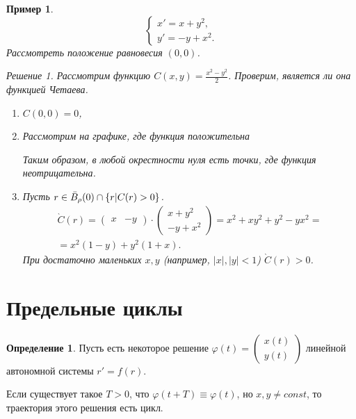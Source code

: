 \documentclass[a5paper, 10pt]{article}
\theoremstyle{definition}
\newtheorem{Def}{Определение}
\theoremstyle{plain}
\newtheorem{Ex}{Пример}
\theoremstyle{remark}
\newtheorem*{Solution}{Решение}
\begin{document}
	\begin{Ex}
		\[
		\begin{cases}
			x' = x+ y^2,\\
			y'=-y+x^2.
		\end{cases}
		\]
		Рассмотреть положение равновесия $(0,0)$.
		\begin{Solution}
			Рассмотрим функцию $C(x,y) = \frac{x^2-y^2}{2}$. Проверим, является ли она функцией Четаева.
			\begin{enumerate}
				\item $C(0,0) = 0$,
				\item Рассмотрим на графике, где функция положительна
				\begin{figure}[h!]
					\centering
				\end{figure}
				Таким образом, в любой окрестности нуля есть точки, где функция неотрицательна.
				\item Пусть $r \in \bar{B}_\rho (0) \cap \left\{r|C(r)>0\right\}$.
				\[
				\begin{split}
					\grave{C}(r) = \begin{pmatrix}
						x & -y
					\end{pmatrix} \cdot \begin{pmatrix}
					x+y^2 \\ -y+x^2
				\end{pmatrix} = x^2+xy^2 + y^2-yx^2 =\\
			= x^2(1-y) + y^2(1+x).
				\end{split}
				\]
				При достаточно маленьких $x,y$ (например, $|x|, |y|<1$) $\grave{C}(r) > 0$.
			\end{enumerate}
		\end{Solution}
	\end{Ex}

	\section{Предельные циклы}
	\begin{Def}
		Пусть есть некоторое решение $\varphi(t) = \begin{pmatrix}
			x(t)\\y(t)
		\end{pmatrix}$ линейной автономной системы $r' = f(r)$.
	
		Если существует такое $T>0$, что $\varphi(t+T) \equiv \varphi(t)$, но $x,y \ne const$, то траектория этого решения есть цикл.
	\end{Def}
\end{document}

